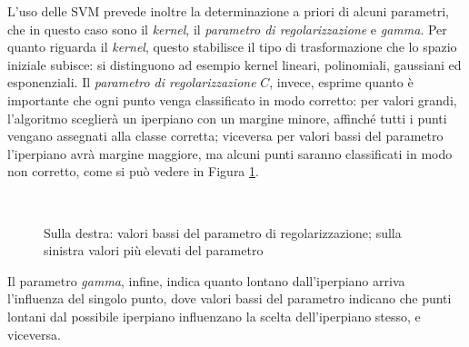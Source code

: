 \documentclass[oneside, openany]{book}
\begin{document}
	L'uso delle SVM prevede inoltre la determinazione a priori di alcuni parametri, che in questo caso sono il \textit{kernel}, il \textit{parametro di regolarizzazione} e \textit{gamma}. Per quanto riguarda il \textit{kernel}, questo stabilisce il tipo di trasformazione che lo spazio iniziale subisce: si distinguono ad esempio kernel lineari, polinomiali, gaussiani ed esponenziali. Il \textit{parametro di regolarizzazione} $C$, invece, esprime quanto è importante che ogni punto venga classificato in modo corretto: per valori grandi, l'algoritmo sceglierà un iperpiano con un margine minore, affinché tutti i punti vengano assegnati alla classe corretta; viceversa per valori bassi del parametro l'iperpiano avrà margine maggiore, ma alcuni punti saranno classificati in modo non corretto, come si può vedere in Figura \ref{fig:svm}.
	\begin{figure}[h]
		\centering
		 \quad
		 \\
		\caption{Sulla destra: valori bassi del parametro di regolarizzazione; sulla sinistra valori più elevati del parametro}
		\label{fig:svm}
	\end{figure}
	Il parametro \textit{gamma}, infine, indica quanto lontano dall'iperpiano arriva l'influenza del singolo punto, dove valori bassi del parametro indicano che punti lontani dal possibile iperpiano influenzano la scelta dell'iperpiano stesso, e viceversa.	
	
\end{document}
